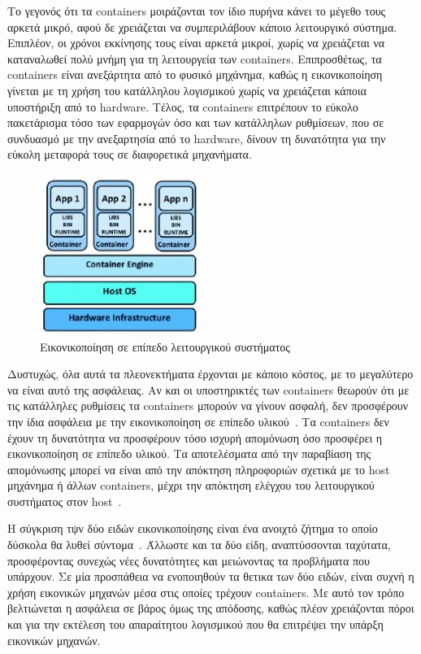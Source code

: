 Το γεγονός ότι τα containers μοιράζονται τον ίδιο πυρήνα κάνει το μέγεθο τους
αρκετά μικρό, αφού δε χρειάζεται να συμπεριλάβουν κάποιο λειτουργικό σύστημα.
Επιπλέον, οι χρόνοι εκκίνησης τους είναι αρκετά μικροί, χωρίς να χρειάζεται να
καταναλωθεί πολύ μνήμη για τη λειτουργεία των containers. Eπιπροσθέτως, τα
containers είναι ανεξάρτητα από το φυσικό μηχάνημα, καθώς η εικονικοποίηση
γίνεται με τη χρήση του κατάλληλου λογισμικού χωρίς να χρειάζεται κάποια
υποστήριξη από το hardware. Τέλος, τα containers επιτρέπουν το εύκολο
πακετάρισμα τόσο των εφαρμογών όσο και των κατάλληλων ρυθμίσεων, που σε
συνδυασμό με την ανεξαρτησία από το hardware, δίνουν τη
δυνατότητα για την εύκολη μεταφορά τους σε διαφορετικά μηχανήματα.

\newpage
\begin{figure}[htp]
\centering
\includegraphics{figures/containers.jpg}
\caption{Εικονικοποίηση σε επίπεδο λειτουργικού συστήματος\label{fig2}}
\end{figure}

Δυστυχώς, όλα αυτά τα πλεονεκτήματα έρχονται με κάποιο κόστος, με το μεγαλύτερο
να είναι αυτό της ασφάλειας. Αν και οι υποστηρικτές των containers θεωρούν ότι
με τις κατάλληλες ρυθμίσεις τα containers μπορούν να γίνουν ασφαλή, δεν
προσφέρουν την ίδια ασφάλεια με την εικονικοποίηση σε επίπεδο
υλικού~\cite{hayden2015securing}. Τα containers δεν έχουν τη δυνατότητα να
προσφέρουν τόσο ισχυρή απομόνωση όσο προσφέρει η εικονικοποίηση σε επίπεδο
υλικού. Τα αποτελέσματα από την παραβίαση της απομόνωσης μπορεί να είναι από την
απόκτηση πληροφοριών σχετικά με το host μηχάνημα ή άλλων containers, μέχρι την
απόκτηση ελέγχου του λειτουργικού συστήματος στον
host~\cite{gao2017containerleaks}. 

Η σύγκριση τψν δύο ειδών εικονικοποίησης είναι ένα ανοιχτό ζήτημα το οποίο
δύσκολα θα λυθεί σύντομα~\cite{eder2016hypervisor}. Άλλωστε και τα δύο είδη,
αναπτύσσονται ταχύτατα, προσφέροντας συνεχώς νέες δυνατότητες και μειώνοντας τα
προβλήματα που υπάρχουν. Σε μία προσπάθεια να ενοποιηθούν τα θετικα των δύο
ειδών, είναι συχνή η χρήση εικονικών μηχανών μέσα στις οποίες τρέχουν
containers. Με αυτό τον τρόπο βελτιώνεται η ασφάλεια σε βάρος όμως της απόδοσης,
καθώς πλέον χρειάζονται πόροι και για την εκτέλεση του απαραίτητου  λογισμικού 
που θα επιτρέψει την υπάρξη εικονικών μηχανών.

